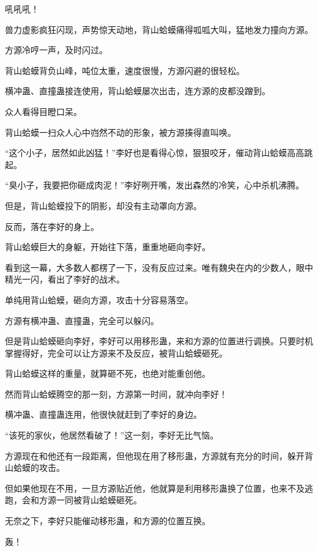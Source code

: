 
\begin{this_body}



吼吼吼！

兽力虚影疯狂闪现，声势惊天动地，背山蛤蟆痛得呱呱大叫，猛地发力撞向方源。

方源冷哼一声，及时闪过。

背山蛤蟆背负山峰，吨位太重，速度很慢，方源闪避的很轻松。

横冲蛊、直撞蛊接连使用，背山蛤蟆屡次出击，连方源的皮都没蹭到。

众人看得目瞪口呆。

背山蛤蟆一扫众人心中岿然不动的形象，被方源揍得直叫唤。

“这个小子，居然如此凶猛！”李好也是看得心惊，狠狠咬牙，催动背山蛤蟆高高跳起。

“臭小子，我要把你砸成肉泥！”李好咧开嘴，发出森然的冷笑，心中杀机沸腾。

但是，背山蛤蟆投下的阴影，却没有主动罩向方源。

反而，落在李好的身上。

背山蛤蟆巨大的身躯，开始往下落，重重地砸向李好。

看到这一幕，大多数人都楞了一下，没有反应过来。唯有魏央在内的少数人，眼中精光一闪，看出了李好的战术。

单纯用背山蛤蟆，砸向方源，攻击十分容易落空。

方源有横冲蛊、直撞蛊，完全可以躲闪。

但是背山蛤蟆砸向李好，李好可以用移形蛊，来和方源的位置进行调换。只要时机掌握得好，完全可以让方源来不及反应，被背山蛤蟆砸死。

背山蛤蟆这样的重量，就算砸不死，也绝对能重创他。

然而背山蛤蟆腾空的那一刻，方源第一时间，就冲向李好！

横冲蛊、直撞蛊连用，他很快就赶到了李好的身边。

“该死的家伙，他居然看破了！”这一刻，李好无比气恼。

方源现在和他还有一段距离，但他现在用了移形蛊，方源就有充分的时间，躲开背山蛤蟆的攻击。

但如果他现在不用，一旦方源贴近他，他就算是利用移形蛊换了位置，也来不及逃跑，会和方源一同被背山蛤蟆砸死。

无奈之下，李好只能催动移形蛊，和方源的位置互换。

轰！


\end{this_body}
